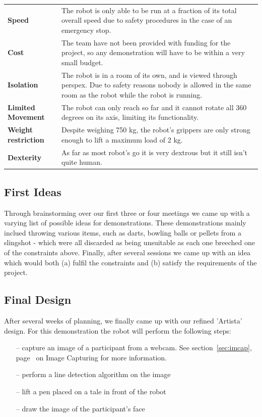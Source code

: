 \documentclass{l3proj}
\begin{document}
\begin{tabular}{l p{12cm}}
\textbf {Speed} & The robot is only able to be run at a fraction of its total overall speed due to safety procedures in the case of an emergency stop.\\
\textbf {Cost} & The team have not been provided with funding for the project, so any demonstration will have to be within a very small budget.\\
\textbf {Isolation} & The robot is in a room of its own, and is viewed through perspex. Due to safety reasons nobody is allowed in the same room as the robot while the robot is running.\\
\textbf {Limited Movement} & The robot can only reach so far and it cannot rotate all 360 degrees on its axis, limiting its functionality.\\
\textbf {Weight restriction} & Despite weighing 750 kg, the robot's grippers are only strong enough to lift a maximum load of 2 kg. \\
\textbf {Dexterity} & As far as most robot’s go it is very dextrous but it still isn’t quite human.\\
\end{tabular}

\subsection{First Ideas}
Through brainstorming over our first three or four meetings we came up with a varying list of possible ideas for demonstrations. These demonstrations mainly inclued throwing various items, such as darts, bowling balls or pellets from a slingshot - which were all discarded as being unsuitable as each one breeched one of the constraints above. Finally, after several sessions we came up with an idea which would both (a) fulfil the constraints and (b) satisfy the requirements of the project.\\

\subsection{Final Design}
After several weeks of planning, we finally came up with our refined 'Artista' design. For this demonstration the robot will perform the following steps: 
\begin{itemize}
\item[--] capture an image of a participant from a webcam. See section~\ref{sec:imcap}, page~\pageref{sec:imcap} on Image Capturing for more information.
\item[--] perform a line detection algorithm on the image
\item[--] lift a pen placed on a tale in front of the robot
\item[--] draw the image of the participant's face
\end{itemize}
 
\end{document}
